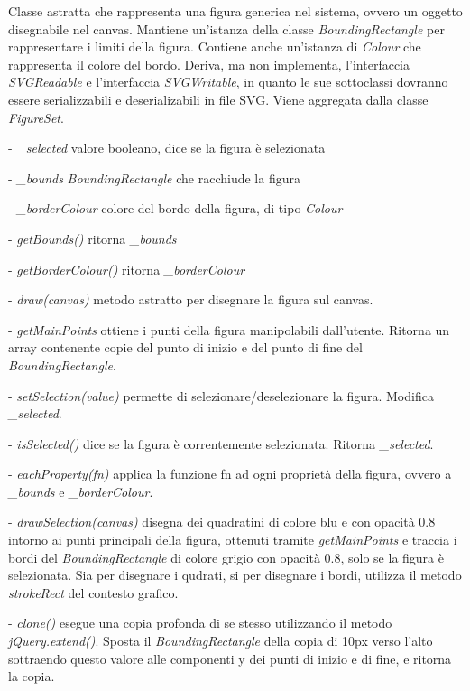 Classe astratta che rappresenta una figura generica nel sistema, ovvero un oggetto disegnabile nel canvas.
Mantiene un'istanza della classe \textit{BoundingRectangle} per rappresentare i limiti della figura. Contiene anche un'istanza di \textit{Colour} che rappresenta il colore del bordo. Deriva, ma non implementa, l'interfaccia \textit{SVGReadable} e l'interfaccia \textit{SVGWritable}, in quanto le sue sottoclassi dovranno essere serializzabili e deserializabili in file SVG.
Viene aggregata dalla classe \textit{FigureSet}.
\begin{elencopuntato}[\subsubsecindent]
\item[-] \textit{{\_}selected} valore booleano, dice se la figura \`e selezionata
\item[-] \textit{{\_}bounds} \textit{BoundingRectangle} che racchiude la figura
\item[-] \textit{{\_}borderColour} colore del bordo della figura, di tipo \textit{Colour}
\end{elencopuntato}
\begin{elencopuntato}[\subsubsecindent]
\item[-] \textit{getBounds()} ritorna \textit{{\_}bounds}
\item[-] \textit{getBorderColour()} ritorna \textit{{\_}borderColour}
\item[-]  \textit{draw(canvas)} metodo astratto per disegnare la figura sul canvas.
\item[-]  \textit{getMainPoints} ottiene i punti della figura manipolabili dall'utente. Ritorna un array contenente copie del punto di inizio e del punto di fine del \textit{BoundingRectangle}.
\item[-]  \textit{setSelection(value)} permette di selezionare/deselezionare la figura. Modifica \textit{{\_}selected}.
\item[-]  \textit{isSelected()} dice se la figura \`e correntemente selezionata. Ritorna \textit{{\_}selected}.
\item[-]  \textit{eachProperty(fn)} applica la funzione fn ad ogni propriet\`a della figura, ovvero a \textit{{\_}bounds} e \textit{{\_}borderColour}.
\item[-] \textit{drawSelection(canvas)} disegna dei quadratini di colore blu e con opacit\`a 0.8 intorno ai punti principali della figura, ottenuti tramite \textit{getMainPoints} e traccia i bordi del \textit{BoundingRectangle} di colore grigio con opacit\`a 0.8, solo se la figura \`e selezionata. Sia per disegnare i qudrati, si per disegnare i bordi, utilizza il metodo \textit{strokeRect} del contesto grafico.
\item[-] \textit{clone()} esegue una copia profonda di se stesso utilizzando il metodo \textit{jQuery.extend()}. Sposta il \textit{BoundingRectangle} della copia di 10px verso l'alto sottraendo questo valore alle componenti y dei punti di inizio e di fine, e ritorna la copia.
\end{elencopuntato}


